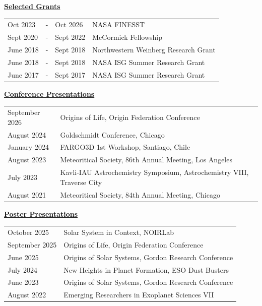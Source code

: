 \documentclass[11pt]{article}
\begin{document}
\vspace{1em}
\noindent\textbf{\underline{Selected Grants}}

\noindent
\begin{tabular}{l@{ }c@{ }ll}
    Oct 2023  &-& Oct 2026 &  NASA FINESST \\
    Sept 2020 &-& Sept 2022 &  McCormick Fellowship \\
    June 2018 &-& Sept 2018  & Northwestern Weinberg Research Grant \\
    June 2018 &-& Sept 2018  & NASA ISG Summer Research Grant \\
    June 2017 &-& Sept 2017  & NASA ISG Summer Research Grant \\
\end{tabular}

\vspace{1em}
\noindent\textbf{\underline{Conference Presentations}}

\noindent
\begin{tabular}{ll}
September 2026 & Origins of Life, Origin Federation Conference  \\
August 2024 & Goldschmidt Conference, Chicago  \\
January 2024 & FARGO3D 1st Workshop, Santiago, Chile  \\
August 2023 & Meteoritical Society, 86th Annual Meeting, Los Angeles  \\
July 2023 & Kavli-IAU Astrochemistry Symposium, Astrochemistry VIII, Traverse City  \\
August 2021 & Meteoritical Society, 84th Annual Meeting, Chicago \\
\end{tabular}

\vspace{1em}
\noindent\textbf{\underline{Poster Presentations}}

\noindent
\begin{tabular}{ll}
October 2025 & Solar System in Context, NOIRLab  \\
September 2025 & Origins of Life, Origin Federation Conference  \\
June 2025 & Origins of Solar Systems, Gordon Research Conference  \\
July 2024 & New Heights in Planet Formation, ESO Dust Busters  \\
June 2023 & Origins of Solar Systems, Gordon Research Conference  \\
August 2022 & Emerging Researchers in Exoplanet Sciences VII \\ 
\end{tabular}
\end{document}
